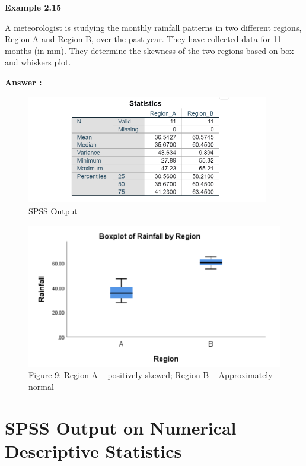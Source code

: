\documentclass[
  a4paper,
  DIV=11,
  numbers=noendperiod,
  oneside]{scrreprt}
\begin{document}
{\textbf{Example 2.15}}

A meteorologist is studying the monthly rainfall patterns in two
different regions, Region A and Region B, over the past year. They have
collected data for 11 months (in mm). They determine the skewness of the
two regions based on box and whiskers plot.

{\textbf{Answer :}}

\begin{figure}

{\centering \includegraphics[width=4.16667in,height=\textheight]{images/ch2/picture18.png}

}

\caption{SPSS Output}

\end{figure}

\begin{figure}

{\centering \includegraphics[width=5.20833in,height=\textheight]{images/ch2/picture19.png}

}

\caption{Figure 9: Region A -- positively skewed; Region B --
Approximately normal}

\end{figure}

\hypertarget{spss-output-on-numerical-descriptive-statistics}{%
\section{SPSS Output on Numerical Descriptive
Statistics}\label{spss-output-on-numerical-descriptive-statistics}}
\end{document}
